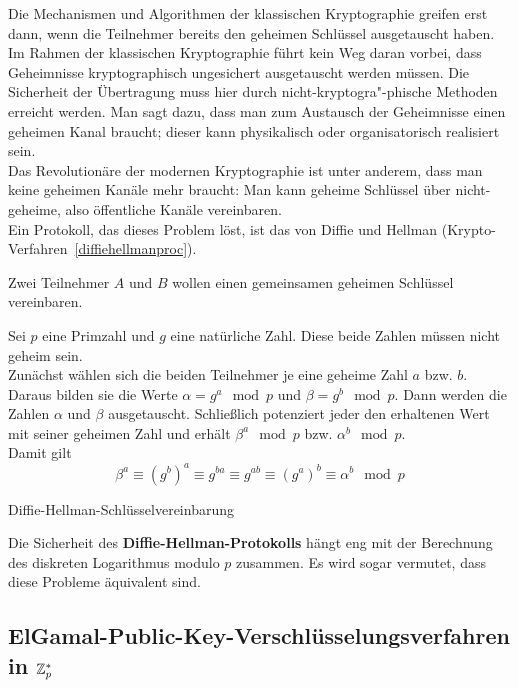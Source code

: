\begin{refsegment}
Die Mechanismen und Algorithmen der klassischen Kryptographie greifen erst dann, wenn die Teilnehmer bereits den geheimen Schlüssel ausgetauscht haben. Im Rahmen der klassischen Kryptographie  führt kein Weg daran vorbei, dass Geheimnisse kryptographisch ungesichert ausgetauscht werden müssen. Die Sicherheit der Übertragung muss hier durch nicht-kryptogra"-phische Methoden erreicht werden. Man sagt dazu, dass man zum Austausch der Geheimnisse einen geheimen Kanal braucht; dieser kann physikalisch oder organisatorisch realisiert sein.\\
Das Revolutionäre der modernen Kryptographie ist unter anderem, dass man keine geheimen Kanäle mehr braucht: Man kann geheime Schlüssel über nicht-geheime, also öffentliche Kanäle vereinbaren.\\
Ein Protokoll, das dieses Problem löst, ist das von Diffie und Hellman (Krypto-Verfahren~\ref{diffiehellmanproc}).

\begin{cryptoprocedure}
Zwei Teilnehmer $ A $ und $ B $ wollen einen gemeinsamen geheimen Schlüssel vereinbaren. \par
Sei $ p $ eine Primzahl und $ g $ eine natürliche Zahl. Diese beide Zahlen müssen nicht geheim sein.\\
Zunächst wählen sich die beiden Teilnehmer je eine geheime Zahl $ a $ bzw. $ b. $ Daraus bilden sie die Werte $ \alpha = g^{a}\mod p $ und $ \beta = g^b \mod p. $ Dann werden die Zahlen $ \alpha $ und $ \beta $ ausgetauscht. Schließlich potenziert jeder den erhaltenen Wert mit seiner geheimen Zahl und erhält $ \beta^{a} \mod p $ bzw. $ \alpha^b \mod p. $\\
Damit gilt
\[ \beta^{a} \equiv (g^b)^{a} \equiv g^{ba} \equiv g^{ab} \equiv (g^{a})^b \equiv \alpha^b \mod p \]
\caption{Diffie-Hellman-Schlüsselvereinbarung}
\label{diffiehellmanproc}
\end{cryptoprocedure}

Die Sicherheit des \textbf{Diffie-Hellman-Protokolls} hängt eng mit der Berechnung des diskreten Logarithmus modulo $p$ zusammen. Es wird sogar vermutet, dass diese Probleme äquivalent sind.


\subsection{ElGamal-Public-Key-Verschlüsselungsverfahren in \texorpdfstring{$ \mathbb{Z}_p^\ast$}{Zp*}}


\end{refsegment}
